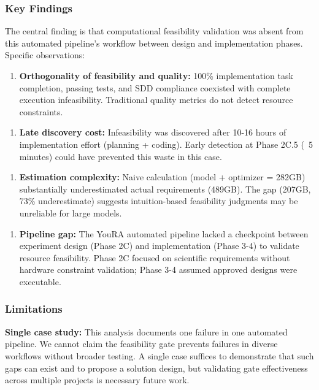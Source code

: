 
\subsubsection{Key Findings}

The central finding is that computational feasibility validation was absent from this automated pipeline's workflow between design and implementation phases. Specific observations:

\begin{enumerate}
\item \textbf{Orthogonality of feasibility and quality:} 100\% implementation task completion, passing tests, and SDD compliance coexisted with complete execution infeasibility. Traditional quality metrics do not detect resource constraints.
\end{enumerate}

\begin{enumerate}
\item \textbf{Late discovery cost:} Infeasibility was discovered after 10-16 hours of implementation effort (planning + coding). Early detection at Phase 2C.5 (~5 minutes) could have prevented this waste in this case.
\end{enumerate}

\begin{enumerate}
\item \textbf{Estimation complexity:} Naive calculation (model + optimizer = 282GB) substantially underestimated actual requirements (489GB). The gap (207GB, 73\% underestimate) suggests intuition-based feasibility judgments may be unreliable for large models.
\end{enumerate}

\begin{enumerate}
\item \textbf{Pipeline gap:} The YouRA automated pipeline lacked a checkpoint between experiment design (Phase 2C) and implementation (Phase 3-4) to validate resource feasibility. Phase 2C focused on scientific requirements without hardware constraint validation; Phase 3-4 assumed approved designs were executable.
\end{enumerate}

\subsubsection{Limitations}

\textbf{Single case study:} This analysis documents one failure in one automated pipeline. We cannot claim the feasibility gate prevents failures in diverse workflows without broader testing. A single case suffices to demonstrate that such gaps can exist and to propose a solution design, but validating gate effectiveness across multiple projects is necessary future work.

